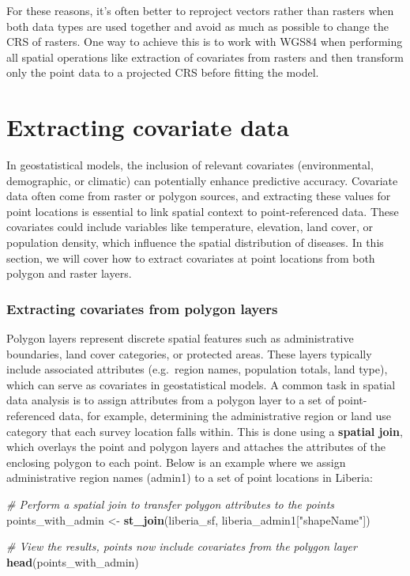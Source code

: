 \documentclass[
  letterpaper,
]{krantz}
\newenvironment{Shaded}{\begin{snugshade}}{\end{snugshade}}
\newcommand{\CommentTok}[1]{\textcolor[rgb]{0.56,0.35,0.01}{\textit{#1}}}
\newcommand{\FunctionTok}[1]{\textcolor[rgb]{0.13,0.29,0.53}{\textbf{#1}}}
\newcommand{\NormalTok}[1]{#1}
\newcommand{\OtherTok}[1]{\textcolor[rgb]{0.56,0.35,0.01}{#1}}
\newcommand{\StringTok}[1]{\textcolor[rgb]{0.31,0.60,0.02}{#1}}
\begin{document}
For these reasons, it's often better to reproject vectors rather than
rasters when both data types are used together and avoid as much as
possible to change the CRS of rasters. One way to achieve this is to
work with WGS84 when performing all spatial operations like extraction
of covariates from rasters and then transform only the point data to a
projected CRS before fitting the model.

\section{Extracting covariate data}\label{extracting-covariate-data}

In geostatistical models, the inclusion of relevant covariates
(environmental, demographic, or climatic) can potentially enhance
predictive accuracy. Covariate data often come from raster or polygon
sources, and extracting these values for point locations is essential to
link spatial context to point-referenced data. These covariates could
include variables like temperature, elevation, land cover, or population
density, which influence the spatial distribution of diseases. In this
section, we will cover how to extract covariates at point locations from
both polygon and raster layers.

\subsubsection{Extracting covariates from polygon
layers}\label{extracting-covariates-from-polygon-layers}

Polygon layers represent discrete spatial features such as
administrative boundaries, land cover categories, or protected areas.
These layers typically include associated attributes (e.g.~region names,
population totals, land type), which can serve as covariates in
geostatistical models. A common task in spatial data analysis is to
assign attributes from a polygon layer to a set of point-referenced
data, for example, determining the administrative region or land use
category that each survey location falls within. This is done using a
\textbf{spatial join}, which overlays the point and polygon layers and
attaches the attributes of the enclosing polygon to each point. Below is
an example where we assign administrative region names (admin1) to a set
of point locations in Liberia:

\begin{Shaded}
\begin{Highlighting}[]
\CommentTok{\# Perform a spatial join to transfer polygon attributes to the points}
\NormalTok{points\_with\_admin }\OtherTok{\textless{}{-}} \FunctionTok{st\_join}\NormalTok{(liberia\_sf, liberia\_admin1[}\StringTok{"shapeName"}\NormalTok{])}

\CommentTok{\# View the results, points now include covariates from the polygon layer}
\FunctionTok{head}\NormalTok{(points\_with\_admin)}
\end{Highlighting}
\end{Shaded}
\end{document}
